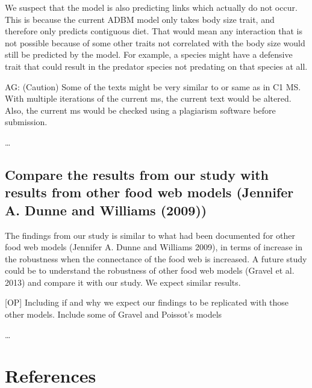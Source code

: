 \documentclass{article}
\begin{document}
We suspect that the model is also predicting links which actually do not
occur. This is because the current ADBM model only takes body size
trait, and therefore only predicts contiguous diet. That would mean any
interaction that is not possible because of some other traits not
correlated with the body size would still be predicted by the model. For
example, a species might have a defensive trait that could result in the
predator species not predating on that species at all.

AG: (Caution) Some of the texts might be very similar to or same as in
C1 MS. With multiple iterations of the current ms, the current text
would be altered. Also, the current ms would be checked using a
plagiarism software before submission.

\ldots{}

\hypertarget{compare-the-results-from-our-study-with-results-from-other-food-web-models-jennifer-a.-dunne-and-williams-2009}{%
\subsection{Compare the results from our study with results from other
food web models (Jennifer A. Dunne and Williams
(2009))}\label{compare-the-results-from-our-study-with-results-from-other-food-web-models-jennifer-a.-dunne-and-williams-2009}}

The findings from our study is similar to what had been documented for
other food web models (Jennifer A. Dunne and Williams 2009), in terms of
increase in the robustness when the connectance of the food web is
increased. A future study could be to understand the robustness of other
food web models (Gravel et al. 2013) and compare it with our study. We
expect similar results.

{[}OP{]} Including if and why we expect our findings to be replicated
with those other models. Include some of Gravel and Poissot's models

\ldots{}

\hypertarget{references}{%
\section*{References}\label{references}}
\end{document}
